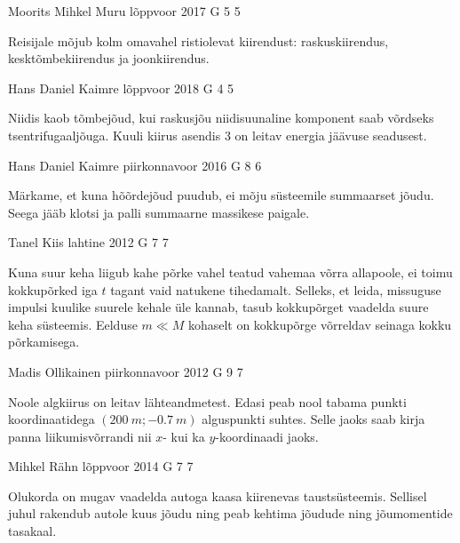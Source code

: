 \documentclass[11pt]{article}
\begin{document}
{%
{Moorits Mihkel Muru} %
{lõppvoor} %
{2017} %
{G 5} %
{5} %
{

\ifHint
Reisijale mõjub kolm omavahel ristiolevat kiirendust: raskuskiirendus, kesktõmbekiirendus ja joonkiirendus.
\fi
}

{Hans Daniel Kaimre} %
{lõppvoor} %
{2018} %
{G 4} %
{5} %
{

\ifHint
Niidis kaob tõmbejõud, kui raskusjõu niidisuunaline komponent saab võrdseks tsentrifugaaljõuga. Kuuli kiirus asendis 3 on leitav energia jäävuse seadusest.
\fi
}

{Hans Daniel Kaimre} %
{piirkonnavoor} %
{2016} %
{G 8} %
{6} %
{

\ifHint
Märkame, et kuna hõõrdejõud puudub, ei mõju süsteemile summaarset jõudu. Seega jääb klotsi ja palli summaarne massikese paigale.
\fi
}

{Tanel Kiis} %
{lahtine} %
{2012} %
{G 7} %
{7} %
{

\ifHint
Kuna suur keha liigub kahe põrke vahel teatud vahemaa võrra allapoole, ei toimu kokkupõrked iga $t$ tagant vaid natukene tihedamalt. Selleks, et leida, missuguse impulsi kuulike suurele kehale üle kannab, tasub kokkupõrget vaadelda suure keha süsteemis. Eelduse $m\ll M$ kohaselt on kokkupõrge võrreldav seinaga kokku põrkamisega.
\fi
}

{Madis Ollikainen} %
{piirkonnavoor} %
{2012} %
{G 9} %
{7} %
{

\ifHint
Noole algkiirus on leitav lähteandmetest. Edasi peab nool tabama punkti koordinaatidega $(\SI{200}{m};\SI{-0,7}{m})$ alguspunkti suhtes. Selle jaoks saab kirja panna liikumisvõrrandi nii $x$- kui ka $y$-koordinaadi jaoks.
\fi
}

{Mihkel Rähn} %
{lõppvoor} %
{2014} %
{G 7} %
{7} %
{

\ifHint
Olukorda on mugav vaadelda autoga kaasa kiirenevas taustsüsteemis. Sellisel juhul rakendub autole kuus jõudu ning peab kehtima jõudude ning jõumomentide tasakaal.
\fi
}

}
\end{document}
